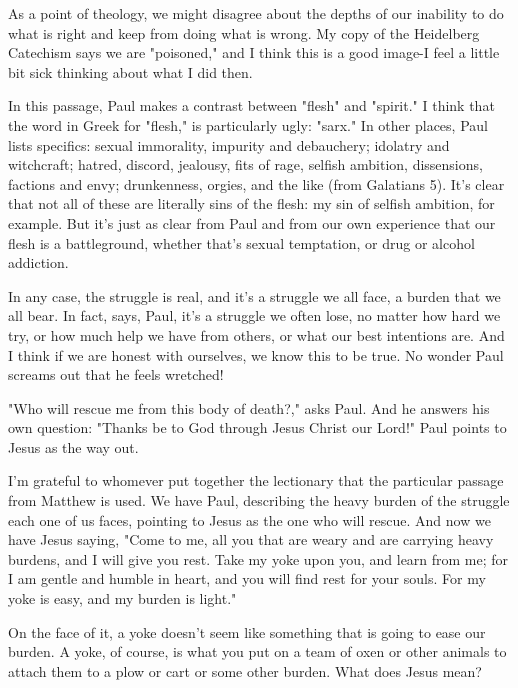 \documentclass[11pt]{article}
\begin{document}
As a point of theology, we might disagree about the depths of our
inability to do what is right and keep from doing what is wrong.
My copy of the Heidelberg Catechism says we are "poisoned," and I
think this is a good image-I feel a little bit sick thinking about
what I did then.

In this passage, Paul makes a contrast between "flesh" and
"spirit." I think that the word in Greek for "flesh," is
particularly ugly: "sarx." In other places, Paul lists specifics:
sexual immorality, impurity and debauchery;  idolatry and
witchcraft; hatred, discord, jealousy, fits of rage, selfish
ambition, dissensions, factions  and envy; drunkenness, orgies,
and the like (from Galatians 5). It's clear that not all of these
are literally sins of the flesh: my sin of selfish ambition, for
example. But it's just as clear from Paul and from our own
experience that our flesh is a battleground, whether that's sexual
temptation, or drug or alcohol addiction.

In any case, the struggle is real, and it's a struggle we all
face, a burden that we all bear. In fact, says, Paul, it's a
struggle we often lose, no matter how hard we try, or how much
help we have from others, or what our best intentions are. And I
think if we are honest with ourselves, we know this to be true. No
wonder Paul screams out that he feels wretched!

"Who will rescue me from this body of death?," asks Paul. And he
answers his own question: "Thanks be to God through Jesus Christ
our Lord!" Paul points to Jesus as the way out.

I'm grateful to whomever put together the lectionary that the
particular passage from Matthew is used. We have Paul, describing
the heavy burden of the struggle each one of us faces, pointing to
Jesus as the one who will rescue. And now we have Jesus saying,
"Come to me, all you that are weary and are carrying heavy
burdens, and I will give you rest. Take my yoke upon you, and
learn from me; for I am gentle and humble in heart, and you will
find rest for your souls. For my yoke is easy, and my burden is
light."

On the face of it, a yoke doesn't seem like something that is
going to ease our burden. A yoke, of course, is what you put on a
team of oxen or other animals to attach them to a plow or cart or
some other burden. What does Jesus mean?
\end{document}

